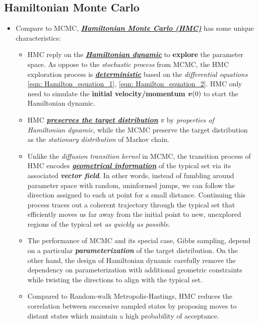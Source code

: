 \documentclass[11pt]{article}
\begin{document}
\subsection{Hamiltonian Monte Carlo}
\begin{itemize}
\item Compare to MCMC, \underline{\emph{\textbf{Hamiltonian Monte Carlo (HMC)}}} \citep{brooks2011handbook} has some unique characteristics:
\begin{itemize}
\item HMC reply on the \underline{\textbf{\emph{Hamiltonian dynamic}}} to \textbf{explore} the parameter space. As oppose to the \emph{stochastic process} from MCMC, the HMC exploration process is \underline{\emph{\textbf{deterministic}}} based on the \emph{differential equations} \eqref{eqn: Hamilton_equation_1}, \eqref{eqn: Hamilton_equation_2}. HMC only need to simulate the \textbf{initial velocity/momentum} $\boldsymbol{v}(0)$ to start the Hamiltonian dynamic.

\item HMC \underline{\textbf{\emph{preserves the target distribution}}} $\pi$ by \emph{properties of Hamiltonian dynamic}, while the MCMC preserve the target distribution as the \emph{stationary distribution} of Markov chain.

\item Unlike the \emph{diffusion transition kernel} in MCMC, the transition process of HMC encodes \underline{\emph{\textbf{geometrical information}}} of the typical set via its associated \emph{\textbf{vector field}}. In other words, instead of fumbling around parameter space with random, uninformed jumps, we can follow the direction assigned to each at point for a small distance.  Continuing this process traces out a coherent trajectory through the typical set that efficiently moves us far away from the initial point to new, unexplored regions of the typical set \emph{as quickly as possible}.  

\item The performance of MCMC and its special case, Gibbs sampling, depend on a particular \emph{\textbf{parameterization}} of the target distribution. On the other hand, the design of Hamiltonian dynamic carefully remove the dependency on parameterization with additional geometric constraints while twisting the directions to align with the typical set. 

\item Compared to Random-walk Metropolis-Hastings, HMC reduces the correlation between successive sampled states by proposing moves to distant states which maintain a high probability of acceptance.
\end{itemize}


\end{itemize}
\end{document}
